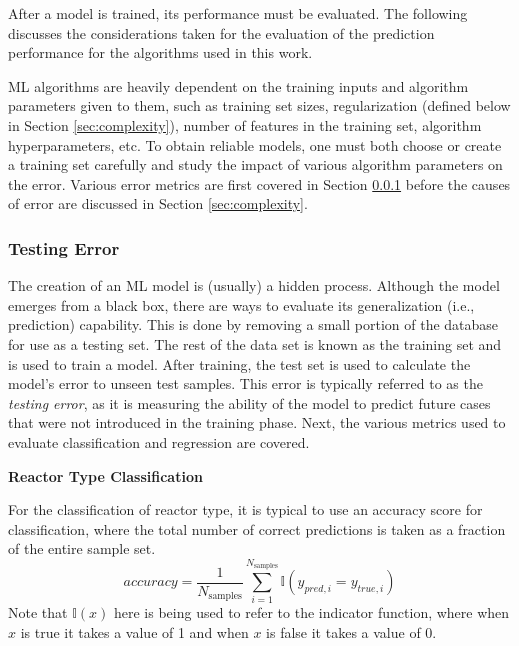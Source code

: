 After a model is trained, its performance must be evaluated. The following
discusses the considerations taken for the evaluation of the prediction
performance for the algorithms used in this work. 

\gls{ML} algorithms are heavily dependent on the training inputs and algorithm
parameters given to them, such as training set sizes, regularization (defined
below in Section \ref{sec:complexity}), number of features in the training set,
algorithm hyperparameters, etc.  To obtain reliable models, one must both
choose or create a training set carefully and study the impact of various
algorithm parameters on the error. Various error metrics are first covered in
Section \ref{sec:testerr} before the causes of error are discussed in Section
\ref{sec:complexity}.

\subsubsection{Testing Error}
\label{sec:testerr}

The creation of an \gls{ML} model is (usually) a hidden process. Although the
model emerges from a black box, there are ways to evaluate its generalization
(i.e., prediction) capability.  This is done by removing a small portion of the
database for use as a testing set.  The rest of the data set is known as the
training set and is used to train a model. After training, the test set is used
to calculate the model's error to unseen test samples.  This error is typically
referred to as the \textit{testing error}, as it is measuring the ability of
the model to predict future cases that were not introduced in the training
phase. Next, the various metrics used to evaluate classification and regression
are covered.

\noindent \textbf{Reactor Type Classification}

For the classification of reactor type, it is typical to use an accuracy score
for classification, where the total number of correct predictions is taken as a
fraction of the entire sample set.
\begin{equation}
  \textit{accuracy} = \frac{1}{N_\text{samples}} \sum_{i=1}^{N_\text{samples}} 
                      \mathbb{I}(y_{pred,i} = y_{true,i})
\end{equation}
Note that $\mathbb{I}(x)$ here is being used to refer to the indicator
function, where when $x$ is true it takes a value of 1 and when $x$ is false it
takes a value of 0.

